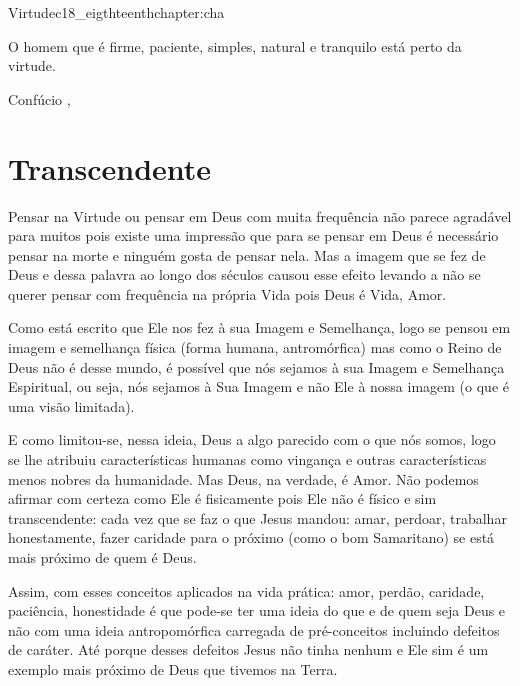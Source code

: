 \begin{chapterpage}{Virtude}{c18_eigthteenthchapter:cha}

\begin{myquotation}O homem que é firme, paciente, simples, natural e tranquilo está perto da virtude.
 
\par\vspace*{15mm}
\mbox{}\hfill \emdash{}Confúcio 
, %
\par\end{myquotation}

\end{chapterpage}



\section{Transcendente}\label{c1_basicformatting:sec}

\emdash{}Pensar na Virtude ou pensar em Deus com muita frequência não parece agradável para muitos pois existe uma impressão que para se pensar em Deus é necessário pensar na morte e ninguém gosta de pensar nela. Mas a imagem que se fez de Deus e dessa palavra ao longo dos séculos causou esse efeito levando a não se querer pensar com frequência na própria Vida pois Deus é Vida, Amor.

\emdash{}Como está escrito que Ele nos fez à sua Imagem e Semelhança, logo se pensou em imagem e semelhança física (forma humana, antromórfica) mas como o Reino de Deus não é desse mundo, é possível que nós sejamos à sua Imagem e Semelhança Espiritual, ou seja, nós sejamos à Sua Imagem e não Ele à nossa imagem (o que é uma visão limitada).

\emdash{}E como limitou-se, nessa ideia, Deus a algo parecido com o que nós somos, logo se lhe atribuiu características humanas como vingança e outras características menos nobres da humanidade. Mas Deus, na verdade, é Amor. Não podemos afirmar com certeza como Ele é fisicamente pois Ele não é físico e sim transcendente: cada vez que se faz o que Jesus mandou: amar, perdoar, trabalhar honestamente, fazer caridade para o próximo (como o bom Samaritano) se está mais próximo de quem é Deus.

\emdash{}Assim, com esses conceitos aplicados na vida prática: amor, perdão, caridade, paciência, honestidade é que pode-se ter uma ideia do que e de quem seja Deus e não com uma ideia antropomórfica carregada de pré-conceitos incluindo defeitos de caráter. Até porque desses defeitos Jesus não tinha nenhum e Ele sim é um exemplo mais próximo de Deus que tivemos na Terra.

